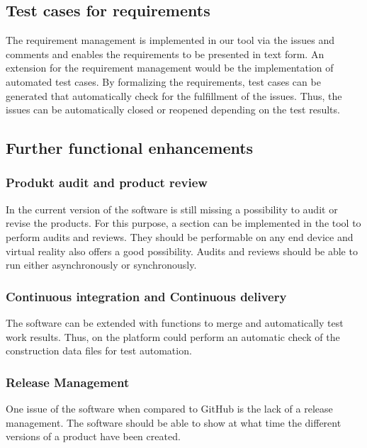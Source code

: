 \subsection*{Test cases for requirements}
The requirement management is implemented in our tool via the issues and comments and enables the requirements to be presented in text form. An extension for the requirement management would be the implementation of automated test cases. By formalizing the requirements, test cases can be generated that automatically check for the fulfillment of the issues. Thus, the issues can be automatically closed or reopened depending on the test results.

\subsection*{Further functional enhancements}
\subsubsection*{Produkt audit and product review}
In the current version of the software is still missing a possibility to audit or revise the products. For this purpose, a section can be implemented in the tool to perform audits and reviews. 
They should be performable on any end device and virtual reality also offers a good possibility. Audits and reviews should be able to run either asynchronously or synchronously.
\subsubsection*{Continuous integration and Continuous delivery}
The software can be extended with functions to merge and automatically test work results.
Thus, on the platform could perform an automatic check of the construction data files for test automation.
\subsubsection*{Release Management}
One issue of the software when compared to GitHub is the lack of a release management. The software should be able to show at what time the different versions of a product have been created.


